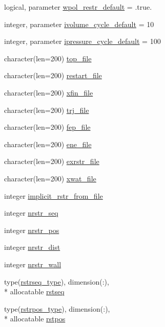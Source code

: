 \begin{DoxyCompactItemize}
logical, parameter \hyperlink{classmd_a22b5128b346ba076ccd5d1b2ccdf2fb3}{wpol\-\_\-restr\-\_\-default} = .true.
\item 
integer, parameter \hyperlink{classmd_a42c0f9c0e9bdf6141851cf83dc1ae2f1}{ivolume\-\_\-cycle\-\_\-default} = 10
\item 
integer, parameter \hyperlink{classmd_afa52eca88132d0756a9e81e162b056ef}{ipressure\-\_\-cycle\-\_\-default} = 100
\item 
character(len=200) \hyperlink{classmd_a46f549758ec3148237a341951a9c02a4}{top\-\_\-file}
\item 
character(len=200) \hyperlink{classmd_acd9f403feb8f8c8f25d3f37b37260d4b}{restart\-\_\-file}
\item 
character(len=200) \hyperlink{classmd_a175118cc4c2b83f72ff33f63a7614d72}{xfin\-\_\-file}
\item 
character(len=200) \hyperlink{classmd_ae684afdb0c2352b58428881c6475a529}{trj\-\_\-file}
\item 
character(len=200) \hyperlink{classmd_a208872905042cd05432ab4e3032fc62d}{fep\-\_\-file}
\item 
character(len=200) \hyperlink{classmd_a2b6af58a2f39e4655f1e398305b4d019}{ene\-\_\-file}
\item 
character(len=200) \hyperlink{classmd_a63722655be0e7c6b3c774c406de66e4d}{exrstr\-\_\-file}
\item 
character(len=200) \hyperlink{classmd_a4d81a7fada60363187e977f833ef08f0}{xwat\-\_\-file}
\item 
integer \hyperlink{classmd_a1e7dddfa1d19d1bda878d2011984800e}{implicit\-\_\-rstr\-\_\-from\-\_\-file}
\item 
integer \hyperlink{classmd_a428e318e3b62346513b70cd92ed79d7d}{nrstr\-\_\-seq}
\item 
integer \hyperlink{classmd_a02282cebebed21d12f2e154a10f66136}{nrstr\-\_\-pos}
\item 
integer \hyperlink{classmd_ac29f71fd4163d5e12b706cdf31f27761}{nrstr\-\_\-dist}
\item 
integer \hyperlink{classmd_a4dade5ed21640405cd882a56f4d27828}{nrstr\-\_\-wall}
\item 
type(\hyperlink{structmd_1_1rstrseq__type}{rstrseq\-\_\-type}), dimension(\-:), \\*
allocatable \hyperlink{classmd_af183580e84d3f1773acdc46fc83db654}{rstseq}
\item 
type(\hyperlink{structmd_1_1rstrpos__type}{rstrpos\-\_\-type}), dimension(\-:), \\*
allocatable \hyperlink{classmd_ae0a036f0b9b98601315ed9fc7642fee8}{rstpos}

\end{DoxyCompactItemize}
